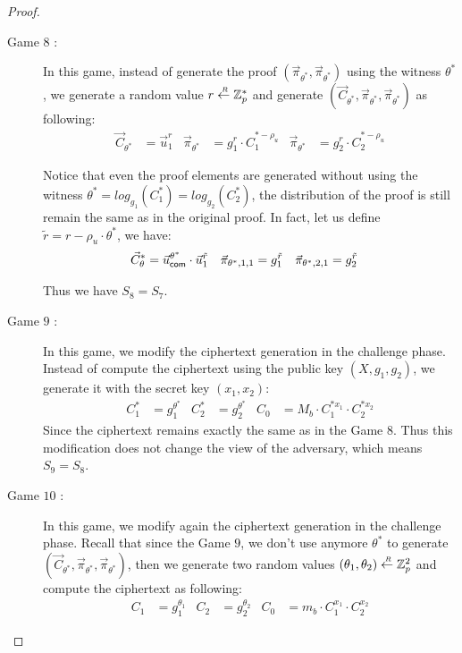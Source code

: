 \begin{proof}
\begin{description}
  \item[\textsf{Game} $8$ :] In this game, instead of generate the proof $(\vec{\pi}_{\theta^*}, \vec{\pi}_{\theta^*})$ using the witness $\theta^*$, we generate a random value $r \stackrel{{\scriptscriptstyle \mkern4mu R}}{\gets} \mathbb{Z}_p^*$ and generate $(\vec{C}_{\theta^*}, \vec{\pi}_{\theta^*}, \vec{\pi}_{\theta^*})$ as following:
    \begin{align*}
      \vec{C}_{\theta^*} &= \vec{u}_1^r & \vec{\pi}_{\theta^*} &= g_1^r \cdot C_1^{*-\rho_u} & \vec{\pi}_{\theta^*} &= g_2^r \cdot C_2^{*-\rho_u}
    \end{align*}

    Notice that even the proof elements are generated without using the witness $\theta^* = log_{g_1}(C_1^*) = log_{g_2}(C_2^*)$, the distribution of the proof is still remain the same as in the original proof. In fact, let us define $\tilde{r} = r - \rho_u \cdot \theta^*$, we have:
    \begin{align*}
      \vec{C}_{\theta}^* &= \vec{u}_{\mathsf{com}}^{\theta^*} \cdot \vec{u}_1^{\tilde{r}} &  \vec{\pi}_{\theta^*,1,1} &= g_1^{\tilde{r}} & \vec{\pi}_{\theta^*,2,1} &= g_2^{\tilde{r}}
    \end{align*}

    Thus we have $S_8 = S_7$.

  \item[\textsf{Game} $9$ :] In this game, we modify the ciphertext generation in the challenge phase. Instead of compute the ciphertext using the public key $(X, g_1, g_2)$, we generate it with the secret key $(x_1, x_2)$:
    \begin{align*}
      C_1^* &= g_1^{\theta^*} & C_2^* &= g_2^{\theta^*} & C_0 &= M_b\cdot C_1^{*x_1} \cdot C_2^{*x_2}  
    \end{align*}
    Since the ciphertext remains exactly the same as in the \textsf{Game} $8$. Thus this modification does not change the view of the adversary, which means $S_9 = S_8$.


  \item[\textsf{Game} $10$ :] In this game, we modify again the ciphertext generation in the challenge phase. Recall that since the \textsf{Game} $9$, we don't use anymore $\theta^{*}$ to generate $(\vec{C}_{\theta^*}, \vec{\pi}_{\theta^*}, \vec{\pi}_{\theta^*})$, then we generate two random values $(\theta_1, \theta_2) \stackrel{{\scriptscriptstyle \mkern4mu R}}{\gets} \mathbb{Z}_p^2$ and compute the ciphertext as following:
    \begin{align*}
      C_1 &= g_1^{\theta_1} & C_2 &= g_2^{\theta_2} & C_0 &= m_b \cdot C_1^{x_1} \cdot C_2^{x_2}
    \end{align*}


\end{description}
\end{proof}
